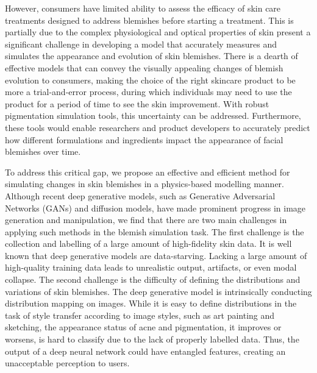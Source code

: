 \begin{spacing}{1.5}
However, consumers have limited ability to assess the efficacy of skin care treatments designed to address blemishes before starting a treatment\cite{doi:10.2352/EI.2023.35.7.IMAGE-276}. This is partially due to the complex physiological and optical properties of skin present a significant challenge in developing a model that accurately measures and simulates the appearance and evolution of skin blemishes. There is a dearth of effective models that can convey the visually appealing changes of blemish evolution to consumers, making the choice of the right skincare product to be more a trial-and-error process, during which individuals may need to use the product for a period of time to see the skin improvement. With robust pigmentation simulation tools, this uncertainty can be addressed. Furthermore, these tools would enable researchers and product developers to accurately predict how different formulations and ingredients impact the appearance of facial blemishes over time.

To address this critical gap, we propose an effective and efficient method for simulating changes in skin blemishes in a physics-based modelling manner. Although recent deep generative models, such as Generative Adversarial Networks\cite{goodfellowGenerativeAdversarialNetworks2014} (GANs) and diffusion models\cite{DBLP:conf/nips/HoJA20,rombach2021highresolution}, have made prominent progress in image generation and manipulation, we find that there are two main challenges in applying such methods in the blemish simulation task. The first challenge is the collection and labelling of a large amount of high-fidelity skin data. It is well known that deep generative models are data-starving. Lacking a large amount of high-quality training data leads to unrealistic output, artifacts, or even modal collapse. The second challenge is the difficulty of defining the distributions and variations of skin blemishes. The deep generative model is intrinsically conducting distribution mapping on images. While it is easy to define distributions in the task of style transfer\cite{DBLP:conf/iclr/DumoulinSK17,DBLP:conf/iccv/ZhuPIE17, DBLP:journals/corr/GatysEB15a} according to image styles, such as art painting and sketching, the appearance status of acne and pigmentation, it improves or worsens, is hard to classify due to the lack of properly labelled data. Thus, the output of a deep neural network could have entangled features, creating an unacceptable perception to users.



\end{spacing}
